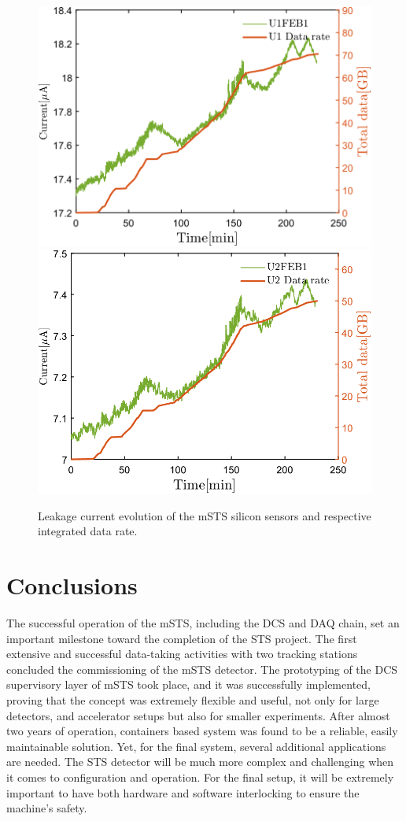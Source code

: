 \begin{figure}[!h]
\centering
\includegraphics[width=0.48\columnwidth]{Chapter6/DCS/images/U1_data_rate.png}
\includegraphics[width=0.48\columnwidth]{Chapter6/DCS/images/U2_data_rate.png}
\caption{Leakage current evolution of the \gls{mSTS} silicon sensors and respective integrated data rate.}
\label{fig_Data}
\end{figure}

\section{Conclusions}

The successful operation of the \gls{mSTS}, including the \gls{DCS} and \gls{DAQ} chain, set an important milestone toward the completion of the \gls{STS} project. The first extensive and successful data-taking activities with two tracking stations concluded the commissioning of the \gls{mSTS} detector. The prototyping of the \gls{DCS} supervisory layer of \gls{mSTS} took place, and it was successfully implemented, proving that the concept was extremely flexible and useful, not only for large detectors, and accelerator setups but also for smaller experiments. After almost two years of operation, containers based system was found to be a reliable, easily maintainable solution. Yet, for the final system, several additional applications are needed. The \gls{STS} detector will be much more complex and challenging when it comes to configuration and operation. For the final setup, it will be extremely important to have both hardware and software interlocking to ensure the machine's safety.

